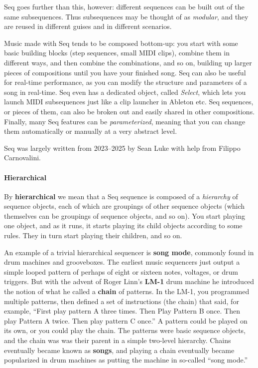 \documentclass[twoside,10pt]{article}
\begin{document}
Seq goes further than this, however: different sequences can be built out of the same subsequences.  Thus subsequences may be thought of as {\it modular}, and they are reused in different guises and in different scenarios.  

Music made with Seq tends to be composed bottom-up: you start with some basic building blocks (step sequences, small MIDI clips), combine them in different ways, and then combine the combinations, and so on, building up larger pieces of compositions until you have your finished song.  Seq can also be useful for real-time performance, as you can modify the structure and parameters of a song in real-time.  Seq even has a dedicated object, called {\it Select}, which lets you launch MIDI subsequences just like a clip launcher in Ableton etc.  Seq sequences, or pieces of them, can also be broken out and easily shared in other compositions.  Finally, many Seq features can be {\it parameterized}, meaning that you can change them automatically or manually at a very abstract level.

Seq was largely written from 2023--2025 by Sean Luke with help from Filippo Carnovalini.


\paragraph{Hierarchical}
By {\bf hierarchical} we mean that a Seq sequence is composed of a {\it hierarchy} of sequence objects, each of which are groupings of other sequence objects (which themselves can be groupings of sequence objects, and so on).  You start playing one object, and as it runs, it starts playing its child objects according to some rules.  They in turn start playing their children, and so on.

An example of a trivial hierarchical sequencer is {\bf song mode}, commonly found in drum machines and grooveboxes.  The earliest music sequencers just output a simple looped pattern of perhaps of eight or sixteen notes, voltages, or drum triggers.  But with the advent of Roger Linn's {\bf LM-1} drum machine he introduced the notion of what he called a {\bf chain} of patterns.  In the LM-1, you programmed multiple patterns, then defined a set of instructions (the chain) that said, for example, ``First play pattern A three times. Then Play Pattern B once.  Then play Pattern A twice.  Then play pattern C once.''   A pattern could be played on its own, or you could play the chain.  The patterns were basic sequence objects, and the chain was was their parent in a simple two-level hierarchy.   Chains eventually became known as {\bf songs}, and playing a chain eventually became popularized in drum machines as putting the machine in so-called ``song mode.''
\end{document}
